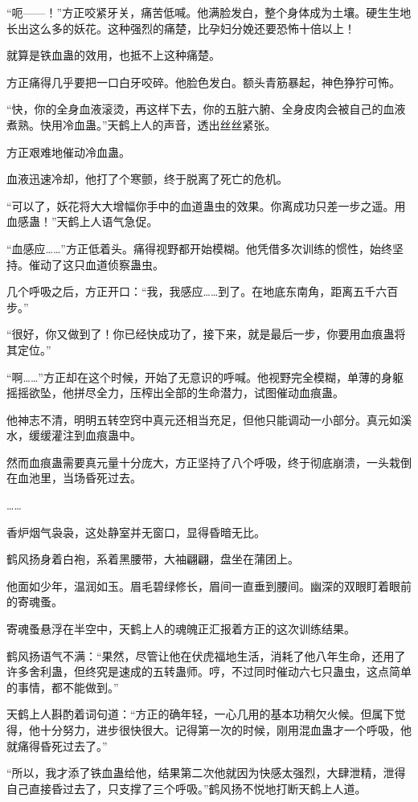 \begin{this_body}
“呃——！”方正咬紧牙关，痛苦低喊。他满脸发白，整个身体成为土壤。硬生生地长出这么多的妖花。这种强烈的痛楚，比孕妇分娩还要恐怖十倍以上！

就算是铁血蛊的效用，也抵不上这种痛楚。

方正痛得几乎要把一口白牙咬碎。他脸色发白。额头青筋暴起，神色狰狞可怖。

“快，你的全身血液滚烫，再这样下去，你的五脏六腑、全身皮肉会被自己的血液煮熟。快用冷血蛊。”天鹤上人的声音，透出丝丝紧张。

方正艰难地催动冷血蛊。

血液迅速冷却，他打了个寒颤，终于脱离了死亡的危机。

“可以了，妖花将大大增幅你手中的血道蛊虫的效果。你离成功只差一步之遥。用血感蛊！”天鹤上人语气急促。

“血感应……”方正低着头。痛得视野都开始模糊。他凭借多次训练的惯性，始终坚持。催动了这只血道侦察蛊虫。

几个呼吸之后，方正开口：“我，我感应……到了。在地底东南角，距离五千六百步。”

“很好，你又做到了！你已经快成功了，接下来，就是最后一步，你要用血痕蛊将其定位。”

“啊……”方正却在这个时候，开始了无意识的呼喊。他视野完全模糊，单薄的身躯摇摇欲坠，他拼尽全力，压榨出全部的生命潜力，试图催动血痕蛊。

他神志不清，明明五转空窍中真元还相当充足，但他只能调动一小部分。真元如溪水，缓缓灌注到血痕蛊中。

然而血痕蛊需要真元量十分庞大，方正坚持了八个呼吸，终于彻底崩溃，一头栽倒在血池里，当场昏死过去。

……

香炉烟气袅袅，这处静室并无窗口，显得昏暗无比。

鹤风扬身着白袍，系着黑腰带，大袖翩翩，盘坐在蒲团上。

他面如少年，温润如玉。眉毛碧绿修长，眉间一直垂到腰间。幽深的双眼盯着眼前的寄魂蚤。

寄魂蚤悬浮在半空中，天鹤上人的魂魄正汇报着方正的这次训练结果。

鹤风扬语气不满：“果然，尽管让他在伏虎福地生活，消耗了他八年生命，还用了许多舍利蛊，但终究是速成的五转蛊师。哼，不过同时催动六七只蛊虫，这点简单的事情，都不能做到。”

天鹤上人斟酌着词句道：“方正的确年轻，一心几用的基本功稍欠火候。但属下觉得，他十分努力，进步很快很大。记得第一次的时候，刚用混血蛊才一个呼吸，他就痛得昏死过去了。”

“所以，我才添了铁血蛊给他，结果第二次他就因为快感太强烈，大肆泄精，泄得自己直接昏过去了，只支撑了三个呼吸。”鹤风扬不悦地打断天鹤上人道。


\end{this_body}
